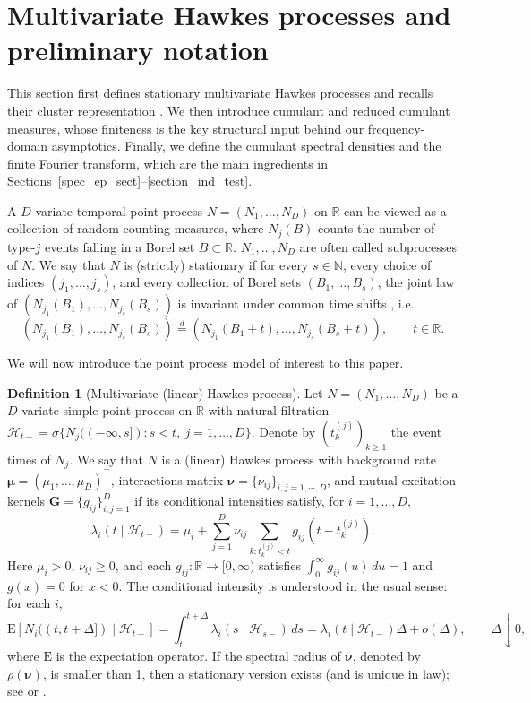 \documentclass[11pt]{article}
\numberwithin{equation}{section}
\theoremstyle{plain}
\theoremstyle{definition}
\theoremstyle{definition}
\newtheorem{definition}{Definition}
\theoremstyle{assumption}
\theoremstyle{proposition}
\theoremstyle{proposition}
\theoremstyle{example}
\theoremstyle{lemma}
\theoremstyle{theorem}
\theoremstyle{remark}
\begin{document}
\section{Multivariate Hawkes processes and preliminary notation}\label{section:hawkes}
This section first defines stationary multivariate Hawkes processes \citep{Hawkes1971} and recalls their cluster representation \citep{hawkes1974cluster}. We then introduce cumulant and reduced cumulant measures, whose finiteness is the key structural input behind our frequency-domain asymptotics. Finally, we define the cumulant spectral densities and the finite Fourier transform, which are the main ingredients in Sections~\ref{spec_ep_sect}--\ref{section_ind_test}.

A $D$-variate temporal point process $N=(N_1,\ldots,N_D)$ on $\mathbb{R}$ can be viewed as a collection of random counting measures, where $N_j(B)$ counts the number of type-$j$ events falling in a Borel set $B\subset\mathbb{R}$. $N_1,\ldots,N_D$ are often called subprocesses of $N$. We say that $N$ is (strictly) stationary if for every $s\in\mathbb{N}$, every choice of indices $(j_1,\ldots,j_s)$, and every collection of Borel sets $(B_1,\ldots,B_s)$, the joint law of $(N_{j_1}(B_1),\ldots,N_{j_s}(B_s))$ is invariant under common time shifts \citep[Section 3.2]{Daley_and_Vere-Jones2003}, i.e.
\[
(N_{j_1}(B_1),\ldots,N_{j_s}(B_s)) \stackrel{d}{=} (N_{j_1}(B_1+t),\ldots,N_{j_s}(B_s+t)), \qquad t\in\mathbb{R}.
\]

We will now introduce the point process model of interest to this paper.
\begin{definition}[Multivariate (linear) Hawkes process]\label{HP_def} 
Let $N=(N_1,\ldots,N_D)$ be a $D$-variate simple point process on $\mathbb R$ with natural filtration $\mathcal H_{t-}=\sigma\{N_j((-\infty,s]): s<t,\ j=1,\ldots,D\}$. Denote by $(t^{(j)}_k)_{k\ge1}$ the event times of $N_j$. We say that $N$ is a (linear) Hawkes process with background rate
$\boldsymbol\mu=(\mu_1,\ldots,\mu_D)^\top$, interactions matrix $\boldsymbol\nu=\{\nu_{ij}\}_{i,j=1,\cdots,D}$, and mutual-excitation kernels
$\boldsymbol G=\{g_{ij}\}_{i,j=1}^D$ if its conditional intensities satisfy, for $i=1,\ldots,D$,
\[
\lambda_i(t\mid\mathcal H_{t-})
= \mu_i + \sum_{j=1}^D \nu_{ij}\sum_{k: t^{(j)}_k<t} g_{ij}(t-t^{(j)}_k).
\]
Here $\mu_i>0$, $\nu_{ij}\ge0$, and each $g_{ij}:\mathbb{R}\to[0,\infty)$ satisfies $\int_0^\infty g_{ij}(u)\,du=1$ and $g(x)=0$ for $x<0$. The conditional intensity is understood in the usual sense: for each $i$,
\[
\mathrm{E}[N_i((t,t+\Delta])\mid \mathcal H_{t-}]
= \int_t^{t+\Delta}\lambda_i(s\mid \mathcal H_{s-})\,ds
= \lambda_i(t\mid \mathcal H_{t-})\Delta+o(\Delta),\qquad \Delta\downarrow0,
\]
where $\mathrm{E}$ is the expectation operator. If the spectral radius of $\boldsymbol{\nu}$, denoted by $\rho(\boldsymbol\nu)$, is smaller than 1, then a stationary version exists (and is unique in law); see \citet[Example 8.3(c)]{Daley_and_Vere-Jones2003} or \cite{Hawkes1971}.
\end{definition}
\end{document}
